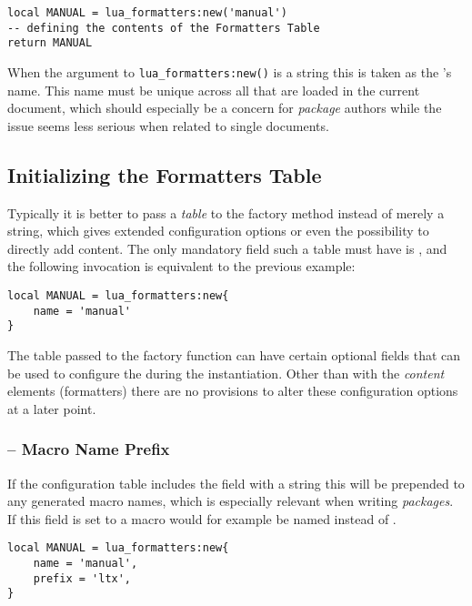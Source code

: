 \documentclass[12pt]{scrartcl}
\begin{document}
\begin{verbatim}
local MANUAL = lua_formatters:new('manual')
-- defining the contents of the Formatters Table
return MANUAL
\end{verbatim}

\noindent When the argument to \texttt{lua_formatters:new()} is a string
this is taken as the 's name.  This name must be unique
across all  that are loaded in the current document, which
should especially be a concern for \emph{package} authors while the issue seems
less serious when related to single documents.


\subsection{Initializing the Formatters Table}
\label{sec:usage-initializing-the-template-table}

Typically it is better to pass a \emph{table} to the factory method instead of
merely a string, which gives extended configuration options or even the
possibility to directly add content. The only mandatory field such a table must
have is , and the following invocation is equivalent to the
previous example:

\begin{verbatim}
local MANUAL = lua_formatters:new{
	name = 'manual'
}
\end{verbatim}

\noindent The table passed to the factory function can have certain optional
fields that can be used to configure the  during the
instantiation. Other than with the \emph{content} elements (formatters) there
are no provisions to alter these configuration options at a later point.

\subsubsection[Macro Name Prefix]{ -- Macro Name Prefix}

If the configuration table includes the  field with a string this
will be prepended to any generated macro names, which is especially relevant
when writing \emph{packages}.  If this field is set to  a macro
would for example be named  instead of .

\begin{verbatim}
local MANUAL = lua_formatters:new{
	name = 'manual',
	prefix = 'ltx',
}
\end{verbatim}
\end{document}
